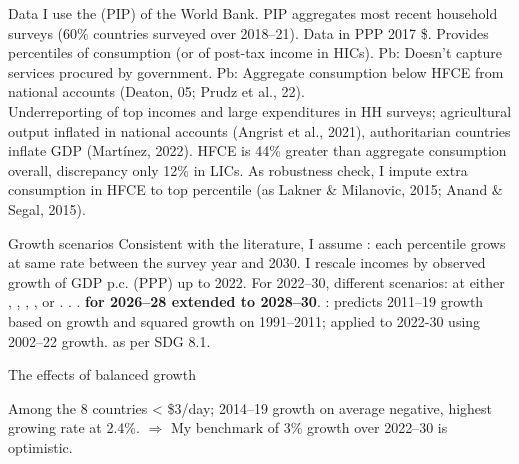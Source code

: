\documentclass[aspectratio=169,xcolor=dvipsnames, 11pt,mathserif]{beamer}
\begin{document}
\begin{frame}{Data}
    \bbsp
    \ip I use the  (PIP) of the World Bank. 
    \ip PIP aggregates most recent household surveys (60\% countries surveyed over 2018--21).
    \ip Data in PPP 2017 \$.
    \ip Provides percentiles of consumption (or of post-tax income in HICs).
    \ip Pb: Doesn't capture services procured by government.
    \ip Pb: Aggregate consumption below HFCE from national accounts (Deaton, 05; Prudz et al., 22). \\ Underreporting of top incomes and large expenditures in HH surveys; agricultural output inflated in national accounts (Angrist et al., 2021), authoritarian countries inflate GDP (Martínez, 2022).
    \ip HFCE is 44\% greater than aggregate consumption overall, discrepancy only 12\% in LICs.
    \ip As robustness check, I impute extra consumption in HFCE to top percentile (as Lakner \& Milanovic, 2015; Anand \& Segal, 2015).
    \ee
\end{frame}

\begin{frame}{Growth scenarios}
    \bbsp
    \ip Consistent with the literature, I assume : each percentile grows at same rate between the survey year and 2030. 
    \ip I rescale incomes by observed growth of GDP p.c. (PPP) up to 2022. For 2022--30, different scenarios: %
    \bbsp
    \ip \textbf{} at either \textbf{}, \textbf{} , \textbf{}, \textbf{}, or \textbf{}.%
    \ip \textbf{}.
    \ip \textbf{}.
    \ip \textbf{ for 2026--28 extended to 2028--30}.
    \ip \textbf{}: predicts 2011--19 growth based on growth and squared growth on 1991--2011; applied to 2022-30 using 2002--22 growth.
    \ip \textbf{} as per SDG 8.1.
    \ee \ee
\end{frame}

\begin{frame}{The effects of balanced growth}
    
    \pause
    Among the 8 countries < \$3/day; 2014--19 growth on average negative, highest growing rate at 2.4\%.
    $\Rightarrow$ My benchmark of 3\% growth over 2022--30 is optimistic.
\end{frame}
\end{document}
